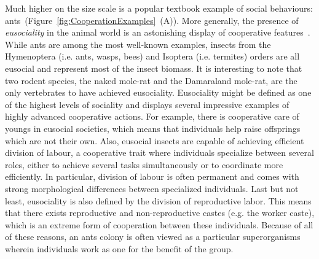     Much higher on the size scale is a popular textbook example of social behaviours: ants~(Figure~\ref{fig:CooperationExamples}~(A)). More generally, the presence of \emph{eusociality} in the animal world is an astonishing display of cooperative features~\parencite{Wilson1990}. While ants are among the most well-known examples, insects from the Hymenoptera (i.e. ants, wasps, bees) and Isoptera (i.e. termites) orders are all eusocial and represent most of the insect biomass\parencite{Wilson2008}. It is interesting to note that two rodent species, the naked mole-rat and the Damaraland mole-rat, are the only vertebrates to have achieved eusociality. Eusociality might be defined as one of the highest levels of sociality and displays several impressive examples of highly advanced cooperative actions. For example, there is cooperative care of youngs in eusocial societies, which means that individuals help raise offsprings which are not their own. Also, eusocial insects are capable of achieving efficient division of labour, a cooperative trait where individuals specialize between several roles, either to achieve several tasks simultaneously or to coordinate more efficiently. In particular, division of labour is often permanent and comes with strong morphological differences between specialized individuals. Last but not least, eusociality is also defined by the division of reproductive labor. This means that there exists reproductive and non-reproductive castes (e.g. the worker caste), which is an extreme form of cooperation between these individuals. Because of all of these reasons, an ants colony is often viewed as a particular superorganisms wherein individuals work as one for the benefit of the group.

